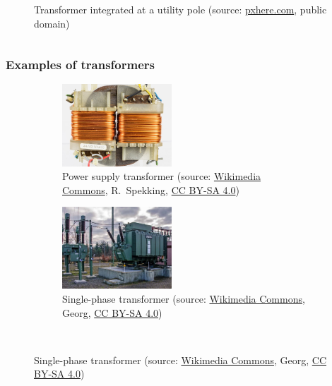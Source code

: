 \begin{frame}
\begin{columns}
\begin{column}{0.35\textwidth}
\begin{figure}
				\caption{Transformer integrated at a utility pole (source: \href{https://pxhere.com/en/photo/795672}{pxhere.com}, public domain)}
			\end{figure}
		\end{column}
		\end{columns}
\end{frame}

\begin{frame}
	\frametitle{Examples of transformers}
	\begin{figure}
		\centering
		\begin{subfigure}[b]{0.49\textwidth}
			\centering
			\includegraphics[width=0.45\textwidth]{fig/lec04/Power_supply_transformer.jpg}
			\caption{Power supply transformer (source: \href{https://commons.wikimedia.org/wiki/File:Philips_N4422_-_power_supply_transformer-2098.jpg}{Wikimedia Commons}, R.~Spekking, \href{https://creativecommons.org/licenses/by-sa/4.0/deed}{CC BY-SA 4.0})}
		\end{subfigure}
		\hfill
		\begin{subfigure}[b]{0.49\textwidth}
			\centering
			\includegraphics[width=0.45\textwidth]{fig/lec04/Single_phase_transformer.jpg}
			\caption{Single-phase transformer (source: \href{https://commons.wikimedia.org/wiki/File:DB_Unterwerk_Güsen,_Trafo_p.jpg}{Wikimedia Commons}, Georg, \href{https://creativecommons.org/licenses/by-sa/4.0/deed.en}{CC BY-SA 4.0})}
		\end{subfigure}
		\\

\end{figure}
\end{frame}
